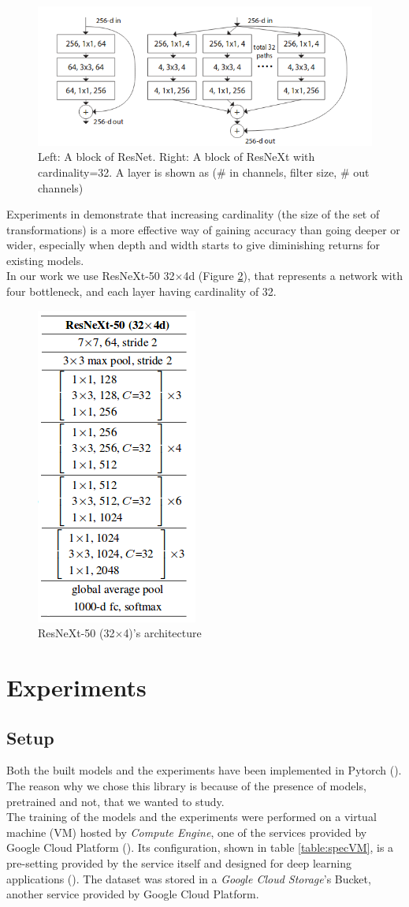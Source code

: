 \documentclass{article}
\begin{document}
\begin{figure}[h]
	\centering
	\includegraphics[width=0.7\linewidth]{image/resnext}
	\caption{Left: A block of ResNet. Right: A block of ResNeXt with cardinality=32. A layer is shown as (\# in channels, filter size, \# out channels)}
	\label{fig:resnext_block}
\end{figure}

Experiments in \cite{resneXt} demonstrate that increasing cardinality (the size of the set of transformations) is a more effective way of gaining accuracy than going deeper or wider, especially when depth and width starts to give diminishing returns for existing models.\\
In our work we use ResNeXt-50 32$\times$4d (Figure \ref{fig:res}), that represents a network with four bottleneck, and each layer having cardinality of 32. 

\begin{figure}
	\centering
	\includegraphics[height=0.4\linewidth]{image/res}
	\caption{ResNeXt-50 (32$\times$4)'s architecture}
	\label{fig:res}
\end{figure}
\section{Experiments}\label{experiments}

\subsection{Setup}
Both the built models and the experiments have been implemented in Pytorch (\cite{pytorch}). The reason why we chose this library is because of the presence of models, pretrained and not, that we wanted to study.\\
The training of the models and the experiments were performed on a virtual machine (VM) hosted by \textit{Compute Engine}, one of the services provided by Google Cloud Platform (\cite{gcloud}). Its configuration, shown in table \ref{table:specVM}, is a pre-setting provided by the service itself and designed for deep learning applications  (\cite{vmconfig}). The dataset was stored in a \textit{Google Cloud Storage}'s Bucket, another service provided by Google Cloud Platform.
\end{document}
